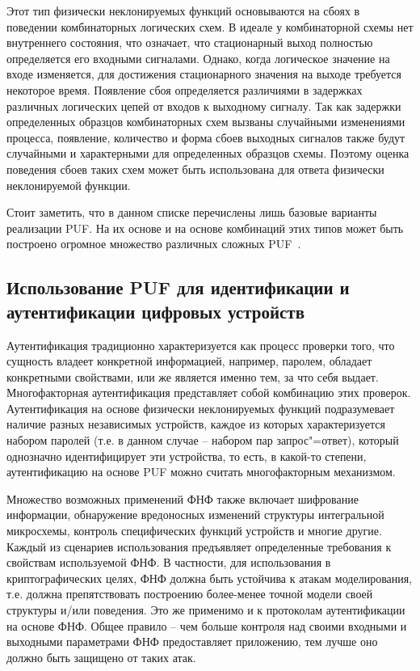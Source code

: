 Этот тип физически неклонируемых функций основываются на сбоях в поведении комбинаторных логических схем. В идеале у комбинаторной схемы нет внутреннего состояния, что означает, что стационарный выход полностью определяется его входными сигналами. Однако, когда логическое значение на входе изменяется, для достижения стационарного значения на выходе требуется некоторое время. Появление сбоя определяется различиями в задержках различных логических цепей от входов к выходному сигналу. Так как задержки определенных образцов комбинаторных схем вызваны случайными изменениями процесса, появление, количество и форма сбоев выходных сигналов также будут случайными и характерными для определенных образцов схемы. Поэтому оценка поведения сбоев таких схем может быть использована для ответа физически неклонируемой функции.

Стоит заметить, что в данном списке перечислены лишь базовые варианты реализации PUF. На их основе и на основе комбинаций этих типов может быть построено огромное множество различных сложных PUF~\cite{cryptowiki_pufs, rmaes_pufs}.


\subsection{Использование PUF для идентификации и аутентификации цифровых устройств}
\label{sub:domain:puf_auth}
Аутентификация традиционно характеризуется как процесс проверки того, что сущность владеет конкретной информацией, например, паролем, обладает конкретными свойствами, или же является именно тем, за что себя выдает. Многофакторная аутентификация представляет собой комбинацию этих проверок. Аутентификация на основе физически неклонируемых функций подразумевает наличие разных независимых устройств, каждое из которых характеризуется набором паролей (т.е. в данном случае -- набором пар запрос"=ответ), который однозначно идентифицирует эти устройства, то есть, в какой-то степени, аутентификацию на основе PUF можно считать многофакторным механизмом.

Множество возможных применений ФНФ также включает шифрование информации, обнаружение вредоносных изменений структуры интегральной микросхемы, контроль специфических функций устройств и многие другие. Каждый из сценариев использования предъявляет определенные требования к свойствам используемой ФНФ. В частности, для использования в криптографических целях, ФНФ должна быть устойчива к атакам моделирования, т.е. должна препятствовать построению более-менее точной модели своей структуры и/или поведения. Это же применимо и к протоколам аутентификации на основе ФНФ. Общее правило -- чем больше контроля над своими входными и выходными параметрами ФНФ предоставляет приложению, тем лучше оно должно быть защищено от таких атак.


